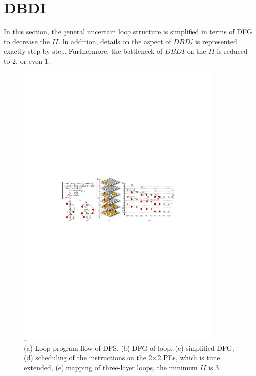 \documentclass[10pt, conference, compsocconf]{IEEEtran}
\begin{document}
\section{DBDI}
In this section, the general uncertain loop structure is simplified in terms of DFG to decrease the $II$. In addition, details on the aspect of $DBDI$ is represented exactly step by step. Furthermore, the bottleneck of $DBDI$ on the $II$ is reduced to 2, or even 1.
\begin{figure}[!t]
	\centering
	\includegraphics[width=0.9\textwidth]{fi/dfg.pdf}
	\caption{(a) Loop program flow of DFS, (b) DFG of loop, (c) simplified DFG, (d) scheduling of the instructions on the 2$\times$2 PEs, which is time extended, (e) mapping of three-layer loops, the minimum $II$ is 3.}
	\label{fig_dfg}
\end{figure}
\end{document}
